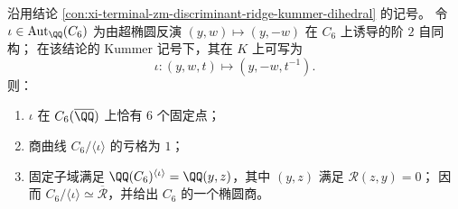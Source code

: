 \begin{conclusion}[二面体提升反射的固定点与椭圆商：\texorpdfstring{$\#\mathrm{Fix}(\iota)=6$}{#Fix(iota)=6} 与亏格 \(1\)]\label{con:xi-terminal-zm-discriminant-ridge-dihedral-fixedpoints-elliptic-quotient}
沿用结论 \ref{con:xi-terminal-zm-discriminant-ridge-kummer-dihedral} 的记号。
令 \(\iota\in\operatorname{Aut}_{\QQ}(C_6)\) 为由超椭圆反演 \((y,w)\mapsto(y,-w)\) 在 \(C_6\) 上诱导的阶 \(2\) 自同构；
在该结论的 Kummer 记号下，其在 \(K\) 上可写为
\[
\iota:(y,w,t)\longmapsto(y,-w,t^{-1}).
\]
则：
\begin{enumerate}
  \item \(\iota\) 在 \(C_{6}(\overline{\QQ})\) 上恰有 \(6\) 个固定点；
  \item 商曲线 \(C_{6}/\langle\iota\rangle\) 的亏格为 \(1\)；
  \item 固定子域满足 \(\QQ(C_{6})^{\langle\iota\rangle}=\QQ(y,z)\)，其中 \((y,z)\) 满足 \(\mathscr R(z,y)=0\)；
  因而 \(C_{6}/\langle\iota\rangle\simeq\overline{\mathcal R}\)，并给出 \(C_6\) 的一个椭圆商。
\end{enumerate}
\end{conclusion}
